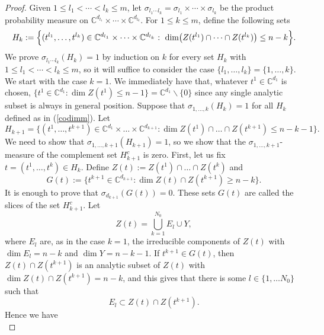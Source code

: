 \documentclass[11pt,leqno,oneside]{amsart}
\numberwithin{equation}{section}
\begin{document}
\begin{proof}
Given $1\le l_1<\cdots<l_k\le m$, let $\sigma_{l_1\cdots l_k}=\sigma_{l_1}\times\cdots\times \sigma_{l_k}$ be the product probability measure on $\mathbb{C}^{d_{l_1}}\times\cdots\times\mathbb{C}^{d_{l_k}}$.
For $1\le k\le m$, define the following sets
$$ \label{codimm}
H_k:=\Bigl\{(t^{l_1},\ldots,t^{l_k})\in \mathbb{C}^{d_{l_1}}\times\cdots\times\mathbb{C}^{d_{l_k}}:\
\dim\bigl(Z(t^{l_1})\cap\cdots\cap Z(t^{l_k})\bigr)\le n-k\Bigr\}.
$$ We prove $\sigma_{l_1\cdots l_k}(H_{k})=1$ by induction on $k$ for every set $H_{k}$ with $1\le l_1<\cdots<l_k\le m$, so it will suffice to consider the case $\{l_{1}, \ldots, l_{k}\}=\{1, \ldots, k\}$. We start with the case $k=1$. We immediately have that, whatever $t^{1} \in \mathbb{C}^{d_{1}}$ is chosen, $\{t^{1} \in \mathbb{C}^{d_{1}}: \dim{Z(t^{1})} \leq n-1\}= \mathbb{C}^{d_{1}} \backslash \{0\}$ since any single analytic subset is always in general position. Suppose that $\sigma_{1,\ldots, k}(H_{k})=1$ for all $H_{k}$ defined as in (\ref{codimm}). Let
	\begin{equation}\label{k1}
		H_{k+1}=\{(t^{1}, \ldots, t^{k+1}) \in \mathbb{C}^{d_{1}} \times \ldots \times \mathbb{C}^{d_{k+1}}: \dim{Z(t^{1}) \cap \ldots \cap Z(t^{k+1})} \leq n-k-1\}.
	\end{equation}We need to show that $\sigma_{1, \ldots, k+1}(H_{k+1})=1$, so we show that the $\sigma_{1, \ldots, k+1}$-measure of the complement set $H^{c}_{k+1}$ is zero. First, let us fix $t=(t^{1}, \ldots, t^{k}) \in H_{k}$. Define $Z(t):= Z(t^{1}) \cap \ldots \cap Z(t^{k})$ and  \begin{equation} \label{Gt}G(t):=\{t^{k+1} \in \mathbb{C}^{d_{k+1}}: \dim{Z(t) \cap Z(t^{k+1})} \geq n-k\}. \end{equation} It is enough to prove that $\sigma_{d_{k+1}}(G(t))=0$. These sets $G(t)$ are called the slices of the set $H^{c}_{k+1}$. Let \begin{equation}Z(t)= \bigcup_{k=1}^{N_{0}}{E_{l} \cup Y}, \end{equation} where $E_{l}$ are, as in the case $k=1$, the irreducible components of $Z(t)$ with $\dim{E_{l}}=n-k$ and $\dim{Y}=n-k-1$. If $t^{k+1} \in G(t)$, then $Z(t) \cap Z(t^{k+1})$ is an analytic subset of $Z(t)$ with $\dim{Z(t) \cap Z(t^{k+1})}=n-k$, and this gives that there is some $l\in \{1, \ldots N_{0}\}$ such that\begin{equation}\label{cdmk}
		E_{l} \subset Z(t) \cap Z(t^{k+1}).
	\end{equation}
	Hence we have \begin{equation}\label{codec}

\end{equation}
\end{proof}
\end{document}
